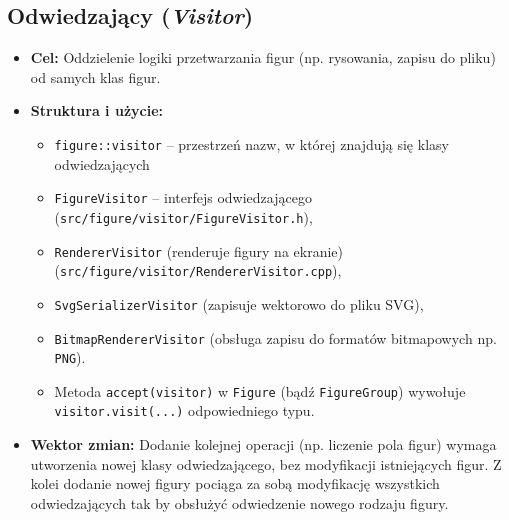 \documentclass[a4paper,12pt]{article}
\begin{document}
\subsection{Odwiedzający (\emph{Visitor})}
\begin{itemize}
    \item \textbf{Cel:} Oddzielenie logiki przetwarzania figur (np. rysowania, 
    zapisu do pliku) od samych klas figur.
    \item \textbf{Struktura i użycie:}
    \begin{itemize}
      \item \texttt{figure::visitor} -- przestrzeń nazw, w której znajdują się klasy odwiedzających
      \item \texttt{FigureVisitor} -- interfejs odwiedzającego (\verb|src/figure/visitor/FigureVisitor.h|), 
      \item \texttt{RendererVisitor} (renderuje figury na ekranie) (\verb|src/figure/visitor/RendererVisitor.cpp|),
      \item \texttt{SvgSerializerVisitor} (zapisuje wektorowo do pliku SVG),
      \item \texttt{BitmapRendererVisitor} (obsługa zapisu do formatów bitmapowych np. \texttt{PNG}).
      \item Metoda \texttt{accept(visitor)} w \texttt{Figure} (bądź \texttt{FigureGroup})
      wywołuje \texttt{visitor.visit(...)} odpowiedniego typu.
    \end{itemize}
    \item \textbf{Wektor zmian:} Dodanie kolejnej operacji (np. liczenie pola figur)
    wymaga utworzenia nowej klasy odwiedzającego, bez modyfikacji istniejących figur. Z kolei
    dodanie nowej figury pociąga za sobą modyfikację wszystkich odwiedzających tak
    by obsłużyć odwiedzenie nowego rodzaju figury.
\end{itemize}
\end{document}
